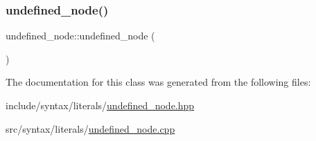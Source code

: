 \subsubsection{\texorpdfstring{undefined\+\_\+node()}{undefined\_node()}}
{\footnotesize\ttfamily undefined\+\_\+node\+::undefined\+\_\+node (\begin{DoxyParamCaption}{ }\end{DoxyParamCaption})}



The documentation for this class was generated from the following files\+:\begin{DoxyCompactItemize}
\item 
include/syntax/literals/\hyperlink{undefined__node_8hpp}{undefined\+\_\+node.\+hpp}\item 
src/syntax/literals/\hyperlink{undefined__node_8cpp}{undefined\+\_\+node.\+cpp}\end{DoxyCompactItemize}

